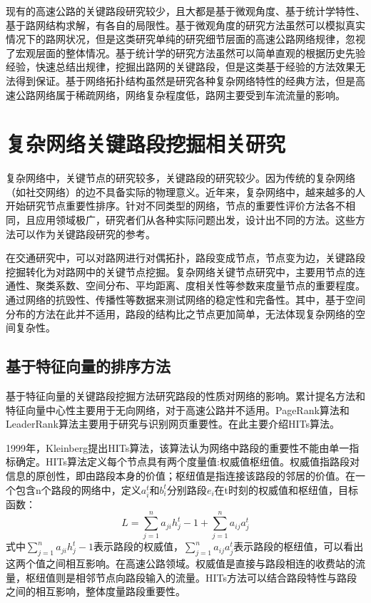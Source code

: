 	现有的高速公路的关键路段研究较少，且大都是基于微观角度、基于统计学特性、基于路网结构求解，有各自的局限性。基于微观角度的研究方法虽然可以模拟真实情况下的路网状况，但是这类研究单纯的研究细节层面的高速公路网络规律，忽视了宏观层面的整体情况。基于统计学的研究方法虽然可以简单直观的根据历史先验经验，快速总结出规律，挖掘出路网的关键路段，但是这类基于经验的方法效果无法得到保证。基于网络拓扑结构虽然是研究各种复杂网络特性的经典方法，但是高速公路网络属于稀疏网络，网络复杂程度低，路网主要受到车流流量的影响。

\section{复杂网络关键路段挖掘相关研究}
	复杂网络中，关键节点的研究较多，关键路段的研究较少。因为传统的复杂网络（如社交网络）的边不具备实际的物理意义。近年来，复杂网络中，越来越多的人开始研究节点重要性排序。针对不同类型的网络，节点的重要性评价方法各不相同，且应用领域极广，研究者们从各种实际问题出发，设计出不同的方法。这些方法可以作为关键路段研究的参考。

	在交通研究中，可以对路网进行对偶拓扑，路段变成节点，节点变为边，关键路段挖掘转化为对路网中的关键节点挖掘。复杂网络关键节点研究中，主要用节点的连通性、聚类系数、空间分布、平均距离、度相关性等参数来度量节点的重要程度。通过网络的抗毁性、传播性等数据来测试网络的稳定性和完备性。其中，基于空间分布的方法在此并不适用，路段的结构比之节点更加简单，无法体现复杂网络的空间复杂性。

	
	\subsection{基于特征向量的排序方法}
	基于特征向量的关键路段挖掘方法研究路段的性质对网络的影响。累计提名方法和特征向量中心性主要用于无向网络，对于高速公路并不适用。PageRank算法和LeaderRank算法主要用于研究与识别网页重要性。在此主要介绍HITs算法。

	1999年，Kleinberg提出HITs算法\parencite{Kleinberg1999Authoritative}，该算法认为网络中路段的重要性不能由单一指标确定。HITs算法定义每个节点具有两个度量值:权威值枢纽值。权威值指路段对信息的原创性，即由路段本身的价值；枢纽值是指连接该路段的邻居的价值。在一个包含n个路段的网络中，定义$a_i^t$和$b_i^t$分别路段$e_i$在t时刻的权威值和枢纽值，目标函数：
	$$L=\sum\limits_{j=1}^n a_{ji}h_j^t-1 + \sum\limits_{j=1}^n a_{ij}a_j^t$$
	式中$\sum\limits_{j=1}^n a_{ji}h_j^t-1$表示路段的权威值，$\sum\limits_{j=1}^n a_{ij}a_j^t$表示路段的枢纽值，可以看出这两个值之间相互影响。在高速公路领域。权威值是直接与路段相连的收费站的流量，枢纽值则是相邻节点向路段输入的流量。HITs方法可以结合路段特性与路段之间的相互影响，整体度量路段重要性。

